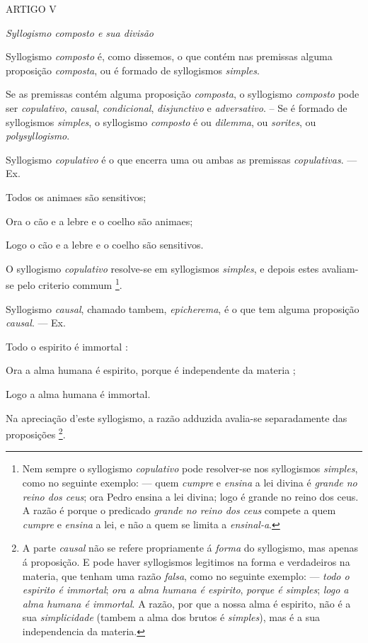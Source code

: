 ARTIGO V

\emph{Syllogismo composto e sua divisão}


 
Syllogismo \emph{composto} é, como dissemos, o que contém nas premissas alguma proposição \emph{composta}, ou é formado de syllogismos \emph{simples}.


Se as premissas contém alguma proposição \emph{composta}, o syllogismo \emph{composto} pode ser \emph{copulativo}, \emph{causal}, \emph{condicional}, \emph{disjunctivo} e \emph{adversativo}. --    Se é formado de syllogismos \emph{simples}, o syllogismo \emph{composto} é ou \emph{dilemma}, ou \emph{sorites}, ou \emph{polysyllogismo}.


Syllogismo \emph{copulativo} é o que encerra uma ou ambas as premissas \emph{copulativas}. --- Ex.

Todos os animaes são sensitivos;

Ora o cão e a lebre e o coelho são animaes;

Logo o cão e a lebre e o coelho são sensitivos.

O syllogismo \emph{copulativo} resolve-se em syllogismos \emph{simples}, e depois estes avaliam-se pelo criterio commum \footnote{Nem sempre o syllogismo \emph{copulativo} pode resolver-se nos syllogismos \emph{simples}, como no seguinte exemplo: --- quem \emph{cumpre} e \emph{ensina} a lei divina é \emph{grande no reino dos ceus}; ora Pedro ensina a lei divina; logo é grande no reino dos ceus. A razão é porque o predicado \emph{grande no reino dos ceus} compete a quem \emph{cumpre} e \emph{ensina} a lei, e não a quem se limita a \emph{ensinal-a}.}.


 
Syllogismo \emph{causal}, chamado tambem, \emph{epicherema}, é o que tem alguma proposição \emph{causal}. --- Ex.

Todo o espirito é immortal :

Ora a alma humana é espirito, porque é independente da materia ;

Logo a alma humana é immortal.

Na apreciação d'este syllogismo, a razão adduzida avalia-se separadamente das proposições \footnote{A parte \emph{causal} não se refere propriamente á \emph{forma} do syllogismo, mas apenas á proposição. E pode haver syllogismos legitimos na forma e verdadeiros na materia, que tenham uma razão \emph{falsa}, como no seguinte exemplo: --- \emph{todo o espirito é immortal}; \emph{ora a alma humana é espirito}, \emph{porque é simples}; \emph{logo a alma humana é immortal}. A razão, por que a nossa alma é espirito, não é a sua \emph{simplicidade} (tambem a alma dos brutos é \emph{simples}), mas é a sua independencia da materia.}.

